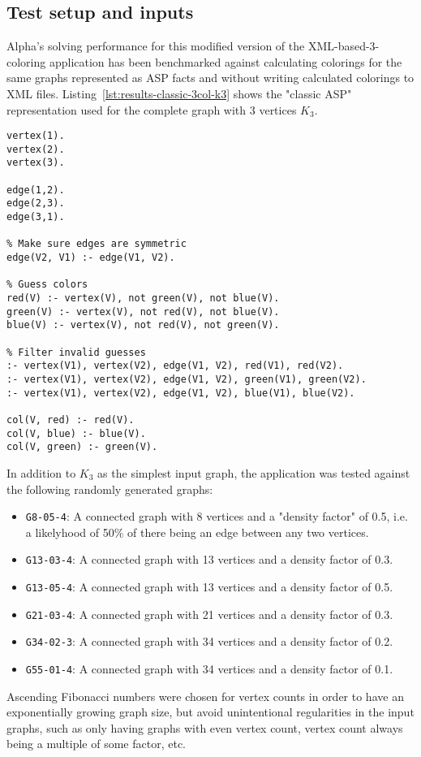 \subsection{Test setup and inputs}

Alpha's solving performance for this modified version of the XML-based-3-coloring application has been benchmarked against calculating colorings for the same graphs represented as ASP facts and without writing calculated colorings to XML files.
Listing~\ref{lst:results-classic-3col-k3} shows the "classic ASP" representation used for the complete graph with 3 vertices $K_3$.

\begin{lstlisting}[style=asp-code, label={lst:results-classic-3col-k3}, caption={Pure-ASP version of a 3-coloring encoding for the graph $K_3$.}]
vertex(1).
vertex(2).
vertex(3).

edge(1,2).
edge(2,3).
edge(3,1).  

% Make sure edges are symmetric
edge(V2, V1) :- edge(V1, V2).

% Guess colors
red(V) :- vertex(V), not green(V), not blue(V).
green(V) :- vertex(V), not red(V), not blue(V).
blue(V) :- vertex(V), not red(V), not green(V).

% Filter invalid guesses
:- vertex(V1), vertex(V2), edge(V1, V2), red(V1), red(V2).
:- vertex(V1), vertex(V2), edge(V1, V2), green(V1), green(V2).
:- vertex(V1), vertex(V2), edge(V1, V2), blue(V1), blue(V2).

col(V, red) :- red(V).
col(V, blue) :- blue(V).
col(V, green) :- green(V).    
\end{lstlisting}

In addition to $K_3$ as the simplest input graph, the application was tested against the following randomly generated graphs:
\begin{itemize}
    \item \texttt{G8-05-4}: A connected graph with 8 vertices and a "density factor" of 0.5, i.e. a likelyhood of 50\% of there being an edge between any two vertices.
    \item \texttt{G13-03-4}: A connected graph with 13 vertices and a density factor of 0.3.
    \item \texttt{G13-05-4}: A connected graph with 13 vertices and a density factor of 0.5.
    \item \texttt{G21-03-4}: A connected graph with 21 vertices and a density factor of 0.3.
    \item \texttt{G34-02-3}: A connected graph with 34 vertices and a density factor of 0.2.
    \item \texttt{G55-01-4}: A connected graph with 34 vertices and a density factor of 0.1.
\end{itemize}
Ascending Fibonacci numbers were chosen for vertex counts in order to have an exponentially growing graph size, but avoid unintentional regularities in the input graphs, such as only having graphs with even vertex count, vertex count always being a multiple of some factor, etc.    

